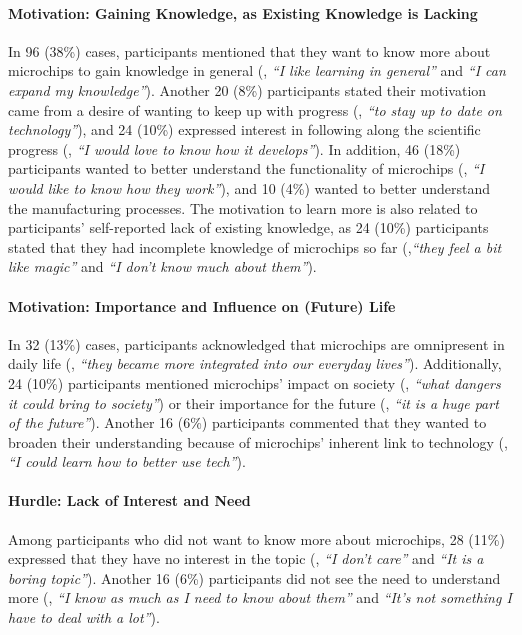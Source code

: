 \paragraph{Motivation: Gaining Knowledge, as Existing Knowledge is Lacking}
In 96 (38\%) cases, participants mentioned that they want to know more about microchips to gain knowledge in general (\eg, \textit{\enquote{I like learning in general}} and \textit{\enquote{I can expand my knowledge}}). 
Another 20 (8\%) participants stated their motivation came from a desire of wanting to keep up with progress (\eg, \textit{\enquote{to stay up to date on technology}}), and 24 (10\%) expressed interest in following along the scientific progress (\eg, \textit{\enquote{I would love to know how it develops}}).
In addition, 46 (18\%) participants wanted to better understand the functionality of microchips (\eg, \textit{\enquote{I would like to know how they work}}), and 10 (4\%) wanted to better understand the manufacturing processes. 
The motivation to learn more is also related to participants' self-reported lack of existing knowledge, as 24 (10\%) participants stated that they had incomplete knowledge of microchips so far (\eg,\textit{\enquote{they feel a bit like magic}} and \textit{\enquote{I don't know much about them}}).


\paragraph{Motivation: Importance and Influence on (Future) Life}
In 32 (13\%) cases, participants acknowledged that microchips are omnipresent in daily life (\eg, \textit{\enquote{they became more integrated into our everyday lives}}). 
Additionally, 24 (10\%) participants mentioned microchips' impact on society (\eg, \textit{\enquote{what dangers it could bring to society}}) or their importance for the future (\eg, \textit{\enquote{it is a huge part of the future}}). 
Another 16 (6\%) participants commented that they wanted to broaden their understanding because of microchips' inherent link to technology (\eg, \textit{\enquote{I could learn how to better use tech}}). 

\paragraph{Hurdle: Lack of Interest and Need}
Among participants who did not want to know more about microchips, 28 (11\%) expressed that they have no interest in the topic (\eg, \textit{\enquote{I don't care}} and \textit{\enquote{It is a boring topic}}). 
Another 16 (6\%) participants did not see the need to understand more (\eg, \textit{\enquote{I know as much as I need to know about them}} and \textit{\enquote{It's not something I have to deal with a lot}}). 

